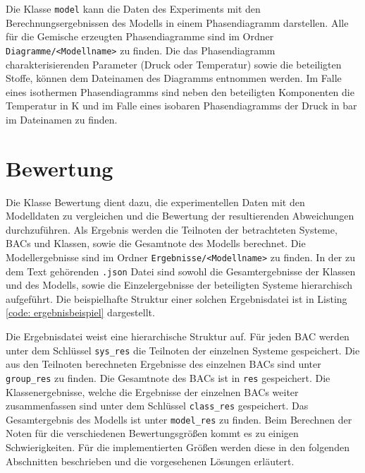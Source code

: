 \documentclass[../thesis.tex]{subfiles}
\begin{document}
Die Klasse \texttt{model} kann die Daten des Experiments mit den Berechnungsergebnissen des Modells in einem Phasendiagramm darstellen. Alle für die Gemische erzeugten Phasendiagramme sind im Ordner \texttt{Diagramme/<Modellname>} zu finden. Die das Phasendiagramm charakterisierenden Parameter (Druck oder Temperatur) sowie die beteiligten Stoffe, können dem Dateinamen des Diagramms entnommen werden. Im Falle eines isothermen Phasendiagramms sind neben den beteiligten Komponenten die Temperatur in K und im Falle eines isobaren Phasendiagramms der Druck in bar im Dateinamen zu finden.

\section{Bewertung}

Die Klasse Bewertung dient dazu, die experimentellen Daten mit den Modelldaten zu vergleichen und die Bewertung der resultierenden Abweichungen durchzuführen. Als Ergebnis werden die Teilnoten der betrachteten Systeme, BACs und Klassen, sowie die Gesamtnote des Modells berechnet. Die Modellergebnisse sind im Ordner
\newline \texttt{Ergebnisse/<Modellname>} zu finden. In der zu dem Text gehörenden \texttt{.json} Datei sind sowohl die Gesamtergebnisse der Klassen und des Modells, sowie die Einzelergebnisse der beteiligten Systeme hierarchisch aufgeführt. Die beispielhafte Struktur einer solchen Ergebnisdatei ist in Listing \autoref{code: ergebnisbeispiel} dargestellt.


\label{code: ergebnisbeispiel}

Die Ergebnisdatei weist eine hierarchische Struktur auf. Für jeden BAC werden unter dem Schlüssel \texttt{sys\_res} die Teilnoten der einzelnen Systeme gespeichert. Die aus den Teilnoten berechneten Ergebnisse des einzelnen BACs sind unter \texttt{group\_res} zu finden. Die Gesamtnote des BACs ist in \texttt{res} gespeichert. Die Klassenergebnisse, welche die Ergebnisse der einzelnen BACs weiter zusammenfassen sind unter dem Schlüssel \texttt{class\_res} gespeichert. Das Gesamtergebnis des Modells ist unter \texttt{model\_res} zu finden. Beim Berechnen der Noten für die verschiedenen Bewertungsgrößen kommt es zu einigen Schwierigkeiten. Für die implementierten Größen werden diese in den folgenden Abschnitten beschrieben und die vorgesehenen Lösungen erläutert.
\end{document}
